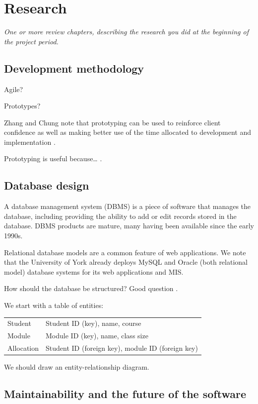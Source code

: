 \documentclass[]{scrartcl}
\begin{document}
\section{Research}

\textit{One or more review chapters, describing the research you did at the beginning of the project period.}

\subsection{Development methodology}

Agile?

Prototypes?

Zhang and Chung note that prototyping can be used to reinforce client confidence as well as making better use of the time allocated to development and implementation \cite{MODFM_2003}.

Prototyping is useful because… \cite{PrototypingWebApplications_2000}.

\subsection{Database design}

A database management system (DBMS) is a piece of software that manages the database, including providing the ability to add or edit records stored in the database. DBMS products are mature, many having been available since the early 1990s.

Relational database models are a common feature of web applications. We note that the University of York already deploys MySQL and Oracle (both relational model) database systems for its web applications and MIS.

How should the database be structured? Good question \cite{DatabaseModelsLanguagesDesign}.

We start with a table of entities:

\begin{tabular}{ l l }
  Student    & Student ID (key), name, course \\
  Module     & Module ID (key), name, class size \\
  Allocation & Student ID (foreign key), module ID (foreign key) \\
\end{tabular}

We should draw an entity-relationship diagram.

\subsection{Maintainability and the future of the software}
\end{document}

